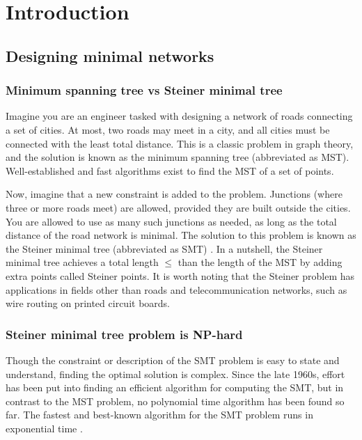 \documentclass{l4proj}
\begin{document}
\def\consentname {Pieter van Tuijl}
\def\consentdate {27 March 2025}
\educationalconsent


\tableofcontents

\chapter{Introduction}


\section{Designing minimal networks}
\subsection{Minimum spanning tree vs Steiner minimal tree}
Imagine you are an engineer tasked with designing a network of roads connecting a set of cities. At most, two roads may meet in a city, and all cities must be connected with the least total distance. This is a classic problem in graph theory, and the solution is known as the minimum spanning tree (abbreviated as MST). Well-established and fast algorithms exist to find the MST of a set of points.

Now, imagine that a new constraint is added to the problem. Junctions (where three or more roads meet) are allowed, provided they are built outside the cities. You are allowed to use as many such junctions as needed, as long as the total distance of the road network is minimal. The solution to this problem is known as the Steiner minimal tree (abbreviated as SMT) \citep{MelzakAlgo}.
In a nutshell, the Steiner minimal tree achieves a total length  $\leq$ than the length of the MST by adding extra points called Steiner points.
It is worth noting that the Steiner problem has applications in fields other than roads and telecommunication networks, such as wire routing on printed circuit boards.

\subsection{Steiner minimal tree problem is NP-hard}
Though the constraint or description of the SMT problem is easy to state and understand, finding the optimal solution is complex.
Since the late 1960s, effort has been put into finding an efficient algorithm for computing the SMT, but in contrast to the MST problem, no polynomial time algorithm has been found so far. The fastest and best-known algorithm for the SMT problem runs in exponential time \citep{geosteiner96}.
\end{document}
